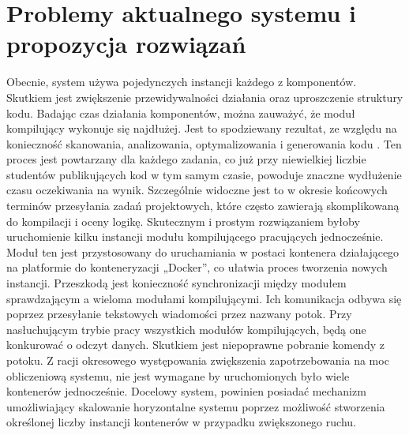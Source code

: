 \section{Problemy aktualnego systemu i propozycja rozwiązań}
\indent Obecnie, system używa pojedynczych instancji każdego z komponentów. Skutkiem jest zwiększenie przewidywalności działania oraz uproszczenie struktury kodu. Badając czas działania komponentów, można zauważyć, że moduł kompilujący wykonuje się najdłużej. Jest to spodziewany rezultat, ze względu na konieczność skanowania, analizowania, optymalizowania i generowania kodu \cite{procesKompilacji}. Ten proces jest powtarzany dla każdego zadania, co już przy niewielkiej liczbie studentów publikujących kod w tym samym czasie, powoduje znaczne wydłużenie czasu oczekiwania na wynik. Szczególnie widoczne jest to w okresie końcowych terminów przesyłania zadań projektowych, które często zawierają skomplikowaną do kompilacji i oceny logikę. Skutecznym i prostym rozwiązaniem byłoby uruchomienie kilku instancji modułu kompilującego pracujących jednocześnie. Moduł ten jest przystosowany do uruchamiania w postaci kontenera działającego na platformie do konteneryzacji „Docker”, co ułatwia proces tworzenia nowych instancji. Przeszkodą jest konieczność synchronizacji między modułem sprawdzającym a wieloma modułami kompilującymi. Ich komunikacja odbywa się poprzez przesyłanie tekstowych wiadomości przez nazwany potok. Przy nasłuchującym trybie pracy wszystkich modułów kompilujących, będą one konkurować o odczyt danych. Skutkiem jest niepoprawne pobranie komendy z potoku. Z racji okresowego występowania zwiększenia zapotrzebowania na moc obliczeniową systemu, nie jest wymagane by uruchomionych było wiele kontenerów jednocześnie. Docelowy system, powinien posiadać mechanizm umożliwiający skalowanie horyzontalne systemu poprzez możliwość stworzenia określonej liczby instancji kontenerów w przypadku zwiększonego ruchu.
